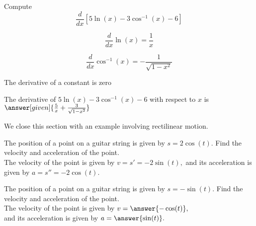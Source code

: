 \documentclass{ximera}
\begin{document}
\begin{problem} %
  Compute 
  \[
  \frac{d}{dx} \left[5\ln(x) - 3\cos^{-1}(x) - 6\right]
  \]
  
    \begin{hint}
      \[
      \frac{d}{dx} \ln(x) = \frac{1}{x}
      \]
    \end{hint}
		\begin{hint}
		  \[
      \frac{d}{dx} \cos^{-1}(x) = -\frac{1}{\sqrt{1-x^2}}
      \]
		\end{hint}
		\begin{hint}
		  The derivative of a constant is zero
		\end{hint}
		
		The derivative of $5\ln(x) - 3\cos^{-1}(x) - 6$ with respect to $x$ is
		 $\answer[given]{\frac{5}{x} + \frac{3}{\sqrt{1-x^2}}}$
	
\end{problem}

We close this section with an example involving rectilinear motion.

\begin{example}
The position of a point on a guitar string is given by $s = 2\cos(t)$.  Find the velocity and acceleration of the point.\\
The velocity of the point is given by $v = s' = -2\sin(t),$ and its acceleration is given by $a = s'' = -2\cos(t).$
\end{example}

\begin{problem}
The position of a point on a guitar string is given by $s = -\sin(t)$.  Find the velocity and acceleration of the point.\\
The velocity of the point is given by $v = \answer{ -\cos(t)},$ \\
and its acceleration is given by $a = \answer{\sin(t)}.$
\end{problem}
\end{document}
